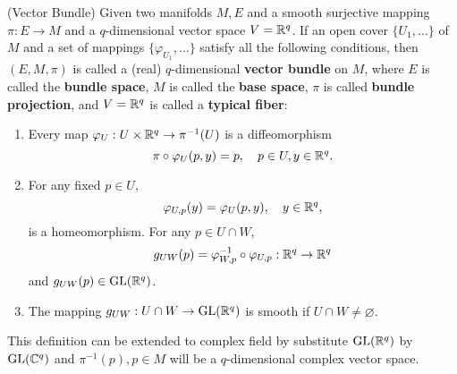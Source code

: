 \begin{definition}(Vector Bundle)
Given two manifolds $M, E$ and a smooth surjective mapping $\pi:E\to M$ and a $q$-dimensional vector space $V=\mathbb{R}^q$. If an open cover $\{U_1,\dots\}$ of $M$ and a set of mappings $\{\varphi_{U_1},\dots\}$ satisfy all the following conditions, then $(E,M,\pi)$ is called a (real) $q$-dimensional \textbf{vector bundle} on $M$, where $E$ is called the \textbf{bundle space}, $M$ is called the \textbf{base space}, $\pi$ is called \textbf{bundle projection}, and $V=\mathbb{R}^q$ is called a \textbf{typical fiber}:
\begin{enumerate}
\item Every map $\varphi_U:U\times \mathbb{R}^q\to\pi^{-1}(U)$ is a diffeomorphism
\begin{equation}
\pi\circ\varphi_U(p,y)=p,\quad p\in U,y\in\mathbb{R}^q.
\end{equation}
\item For any fixed $p\in U$,\
\begin{equation}
\varphi_{U,p}(y)=\varphi_U(p,y),\quad y\in\mathbb{R}^q,
\end{equation}
is a homeomorphism. For any $p\in U\cap W$,
\begin{equation}
g_{UW}(p)=\varphi_{W,p}^{-1}\circ\varphi_{U,p}:\mathbb{R}^q\to\mathbb{R}^q
\end{equation}
and $g_{UW}(p)\in \text{GL}(\mathbb{R}^q)$.
\item The mapping $g_{UW}:U\cap W\to \text{GL}(\mathbb{R}^q)$ is smooth if $U\cap W\ne\varnothing$.
\end{enumerate}
This definition can be extended to complex field by substitute $\text{GL}(\mathbb{R}^q)$ by $\text{GL}(\mathbb{C}^q)$ and $\pi^{-1}(p),p\in M$ will be a $q$-dimensional complex vector space. 
\end{definition}

\begin{theorem}

\end{theorem}